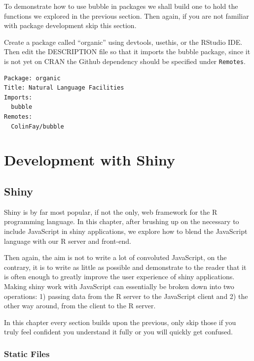 \documentclass[
]{krantz}
\begin{document}
To demonstrate how to use bubble in packages we shall build one to hold the functions we explored in the previous section.
Then again, if you are not familiar with package development skip this section.

Create a package called ``organic'' using devtools, usethis, or the RStudio IDE. Then edit the DESCRIPTION file so that it imports the bubble package, since it is not yet on CRAN the Github dependency should be specified under \texttt{Remotes}.

\begin{verbatim}
Package: organic
Title: Natural Language Facilities
Imports:
  bubble
Remotes:
  ColinFay/bubble
\end{verbatim}

\hypertarget{part-development-with-shiny}{%
\part{Development with Shiny}\label{part-development-with-shiny}}

\hypertarget{shiny-1}{%
\chapter{Shiny}\label{shiny-1}}

Shiny is by far most popular, if not the only, web framework for the R programming language. In this chapter, after brushing up on the necessary to include JavaScript in shiny applications, we explore how to blend the JavaScript language with our R server and front-end.

Then again, the aim is not to write a lot of convoluted JavaScript, on the contrary, it is to write as little as possible and demonstrate to the reader that it is often enough to greatly improve the user experience of shiny applications. Making shiny work with JavaScript can essentially be broken down into two operations: 1) passing data from the R server to the JavaScript client and 2) the other way around, from the client to the R server.

In this chapter every section builds upon the previous, only skip those if you truly feel confident you understand it fully or you will quickly get confused.

\hypertarget{static-files}{%
\section*{Static Files}\label{static-files}}
\end{document}

